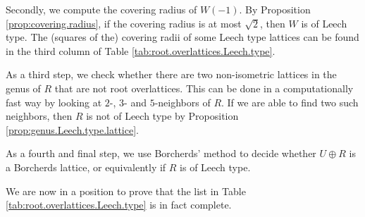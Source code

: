 \documentclass[11pt,letterpaper]{amsart}
\begin{document}
Secondly, we compute the covering radius of $W(-1)$. By Proposition \ref{prop:covering.radius}, if the covering radius is at most $\sqrt{2}$, then $W$ is of Leech type. The (squares of the) covering radii of some Leech type lattices can be found in the third column of Table \ref{tab:root.overlattices.Leech.type}.

As a third step, we check whether there are two non-isometric lattices in the genus of $R$ that are not root overlattices. This can be done in a computationally fast way by looking at $2$-, $3$- and $5$-neighbors of $R$. If we are able to find two such neighbors, then $R$ is not of Leech type by Proposition \ref{prop:genus.Leech.type.lattice}.

As a fourth and final step, we use Borcherds' method to decide whether $U\oplus R$ is a Borcherds lattice, or equivalently if $R$ is of Leech type.

We are now in a position to prove that the list in Table \ref{tab:root.overlattices.Leech.type} is in fact complete.
\end{document}
